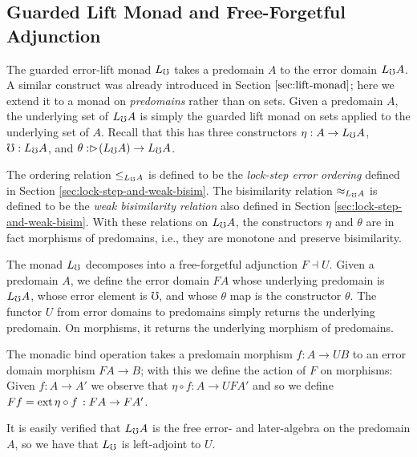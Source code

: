 \subsection{Guarded Lift Monad and Free-Forgetful Adjunction}\label{sec:guarded-lift-monad}

The guarded error-lift monad $L_\mho$ takes a predomain $A$ to the error domain
$L_\mho A$. A similar construct was already introduced in Section
$\ref{sec:lift-monad}$; here we extend it to a monad on \emph{predomains} rather
than on sets. Given a predomain $A$, the underlying set of $L_\mho A$ is simply the
guarded lift monad on sets applied to the underlying set of $A$. Recall that
this has three constructors $\eta : A \to L_\mho A$, $\mho : L_\mho A$, and $\theta :
\vartriangleright \hspace{-0.2em} (L_\mho A) \to L_\mho A$.

The ordering relation $\le_{L_\mho A}$ is defined to be the \emph{lock-step error
ordering} defined in Section \ref{sec:lock-step-and-weak-bisim}. The
bisimilarity relation $\approx_{L_\mho A}$ is defined to be the \emph{weak
bisimilarity relation} also defined in Section
\ref{sec:lock-step-and-weak-bisim}. With these relations on $L_\mho
A$, the constructors $\eta$ and $\theta$ are in fact morphisms of predomains,
i.e., they are monotone and preserve bisimilarity.

The monad $L_\mho$ decomposes into a free-forgetful adjunction $F \dashv U$. Given
a predomain $A$, we define the error domain $FA$ whose underlying predomain is
$L_\mho A$, whose error element is $\mho$, and whose $\theta$ map is the
constructor $\theta$. The functor $U$ from error domains to predomains simply
returns the underlying predomain. On morphisms, it returns the underlying
morphism of predomains.

The monadic bind operation takes a predomain morphism $f : A \to UB$ to an error
domain morphism $FA \to B$; with this we define the action of $F$ on morphisms:
Given $f : A \to A'$ we observe that $\eta \circ f : A \to UFA'$ and so we define
$Ff = \text{ext}\,{\eta \circ f}\,{} : FA \to FA'$.

It is easily verified that $L_\mho A$ is the free error- and later-algebra on the
predomain $A$, so we have that $L_\mho$ is left-adjoint to $U$.

 





